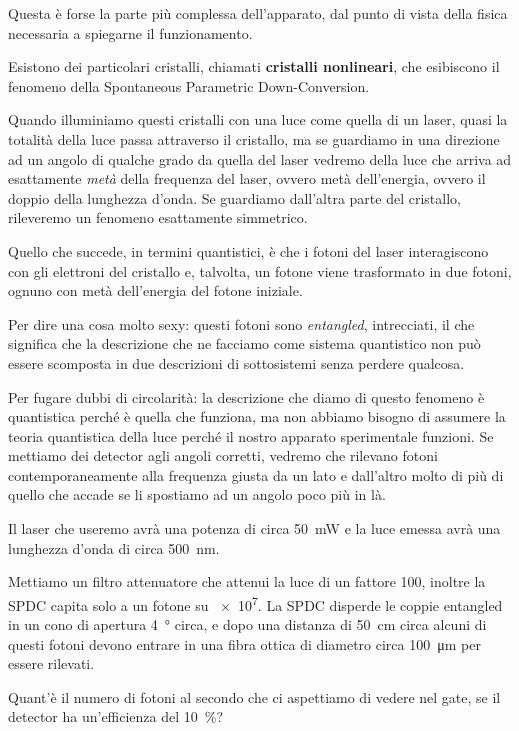 \documentclass[a4paper,12pt]{article}
\begin{document}
Questa è forse la parte più complessa dell'apparato, dal punto di vista della fisica necessaria a spiegarne il funzionamento.

Esistono dei particolari cristalli, chiamati \textbf{cristalli nonlineari}, che esibiscono il fenomeno della Spontaneous Parametric Down-Conversion.

Quando illuminiamo questi cristalli con una luce come quella di un laser, quasi la totalità della luce passa attraverso il cristallo, ma se guardiamo in una direzione ad un angolo di qualche grado da quella del laser vedremo della luce che arriva ad esattamente \emph{metà} della frequenza del laser, ovvero metà dell'energia, ovvero il doppio della lunghezza d'onda. 
Se guardiamo dall'altra parte del cristallo, rileveremo un fenomeno esattamente simmetrico.

Quello che succede, in termini quantistici, è che i fotoni del laser interagiscono con gli elettroni del cristallo e, talvolta, un fotone viene trasformato in due fotoni, ognuno con metà dell'energia del fotone iniziale.

Per dire una cosa molto sexy: questi fotoni sono \emph{entangled}, intrecciati, il che significa che la descrizione che ne facciamo come sistema quantistico non può essere scomposta in due descrizioni di sottosistemi senza perdere qualcosa. 

Per fugare dubbi di circolarità: la descrizione che diamo di questo fenomeno è quantistica perché è quella che funziona, ma non abbiamo bisogno di assumere la teoria quantistica della luce perché il nostro apparato sperimentale funzioni.
Se mettiamo dei detector agli angoli corretti, vedremo che rilevano fotoni contemporaneamente alla frequenza giusta da un lato e dall'altro molto di più di quello che accade se li spostiamo ad un angolo poco più in là. 

\begin{exo}
Il laser che useremo avrà una potenza di circa \SI{50}{mW} e la luce emessa avrà una lunghezza d'onda di circa \SI{500}{nm}. 

Mettiamo un filtro attenuatore che attenui la luce di un fattore 100, inoltre la SPDC capita solo a un fotone su \num{e7}.
La SPDC disperde le coppie entangled in un cono di apertura \SI{4}{\degree} circa, e dopo una distanza di \SI{50}{cm} circa alcuni di questi fotoni devono entrare in una fibra ottica di diametro circa \SI{100}{\micro m} per essere rilevati. 

Quant'è il numero di fotoni al secondo che ci aspettiamo di vedere nel gate, se il detector ha un'efficienza del \SI{10}{\percent}?
\end{exo}
\end{document}
